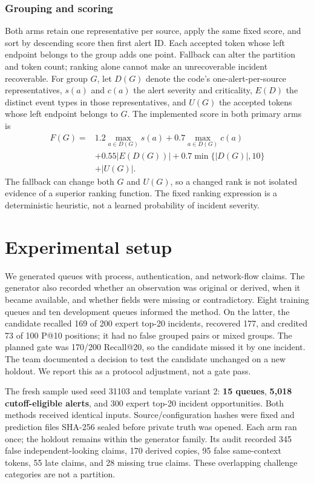 \documentclass[pdflatex,sn-mathphys-num,iicol]{sn-jnl}
\begin{document}
\subsubsection{Grouping and scoring}
Both arms retain one representative per source, apply the same fixed score, and sort by descending score then first alert ID. Each accepted token whose left endpoint belongs to the group adds one point. Fallback can alter the partition and token count; ranking alone cannot make an unrecoverable incident recoverable.
For group $G$, let $D(G)$ denote the code's one-alert-per-source representatives, $s(a)$ and $c(a)$ the alert severity and criticality, $E(D)$ the distinct event types in those representatives, and $U(G)$ the accepted tokens whose left endpoint belongs to $G$. The implemented score in both primary arms is
\begin{equation}\label{eq:score}
\begin{aligned}
F(G)={}&1.2\max_{a\in D(G)}s(a)+0.7\max_{a\in D(G)}c(a)\\
&+0.55|E(D(G))|+0.7\min\{|D(G)|,10\}\\
&+|U(G)|.
\end{aligned}
\end{equation}
The fallback can change both $G$ and $U(G)$, so a changed rank is not isolated evidence of a superior ranking function. The fixed ranking expression is a deterministic heuristic, not a learned probability of incident severity.



\section{Experimental setup}
We generated queues with process, authentication, and network-flow claims. The generator also recorded whether an observation was original or derived, when it became available, and whether fields were missing or contradictory. Eight training queues and ten development queues informed the method. On the latter, the candidate recalled 169 of 200 expert top-20 incidents, recovered 177, and credited 73 of 100 P@10 positions; it had no false grouped pairs or mixed groups. The planned gate was 170/200 Recall@20, so the candidate missed it by one incident. The team documented a decision to test the candidate unchanged on a new holdout. We report this as a protocol adjustment, not a gate pass.

The fresh sample used seed 31103 and template variant 2: \textbf{15 queues}, \textbf{5,018 cutoff-eligible alerts}, and 300 expert top-20 incident opportunities. Both methods received identical inputs. Source/configuration hashes were fixed and prediction files SHA-256 sealed before private truth was opened. Each arm ran once; the holdout remains within the generator family. Its audit recorded 345 false independent-looking claims, 170 derived copies, 95 false same-context tokens, 55 late claims, and 28 missing true claims. These overlapping challenge categories are not a partition.
\end{document}
